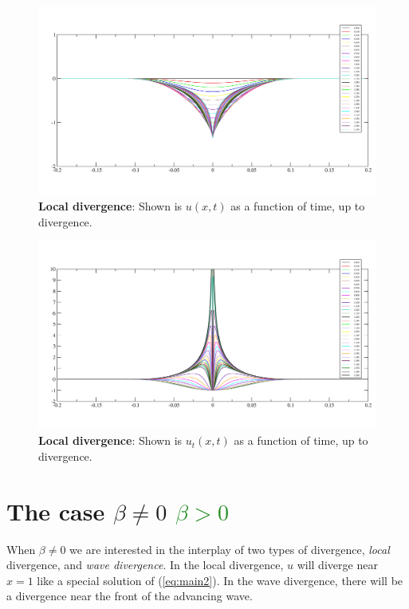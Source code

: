 \documentclass[12pt,a4paper]{article}
\def\eref#1{(\ref{#1})}
\numberwithin{equation}{section}
\theoremstyle{definition} %
\newcommand{\HZ}[1]{\textcolor{ForestGreen}{#1}}
\begin{document}
  \begin{figure}[h!]
  \includegraphics[width=1\textwidth]{uforfig.jpg}
  \caption{{\bf{Local divergence}}: Shown is $u(x,t)$ as a function of
    time, up to divergence.
  }\label{fig:u}
\end{figure}
\begin{figure}[h!]
  \includegraphics[width=1\textwidth]{utforfig.jpg}
  \caption{{\bf{Local divergence}}: Shown is $u_t(x,t)$ as a function of
    time, up to divergence.
  }\label{fig:ut}
\end{figure}


\newpage


\section{The case \sout{$\beta\ne0$} \HZ{$\beta>0$}}
When $\beta \ne0$ we are interested in the interplay of two types of
divergence, \emph{local} divergence, and \emph{wave divergence}.
In the local divergence, $u$ will diverge near $x=1$ like a special solution of
\eref{eq:main2}. In the wave divergence, there will be a divergence
near the front of the advancing wave.
\end{document}
